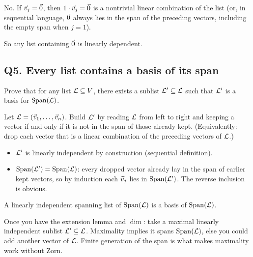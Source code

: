 \begin{coursebox}
No. If $\vec{v}_j=\vec{0}$, then $1\cdot\vec{v}_j=\vec{0}$ is a nontrivial linear combination
of the list (or, in sequential language, $\vec{0}$ always lies in the span of the
preceding vectors, including the empty span when $j=1$).

So any list containing $\vec{0}$ is linearly dependent.
\end{coursebox}

\subsection{Q5. Every list contains a basis of its span}

\begin{promptbox}
Prove that for any list $\mathcal{L}\subseteq V$, there exists a sublist $\mathcal{L}'\subseteq\mathcal{L}$
such that $\mathcal{L}'$ is a basis for $\operatorname{Span}(\mathcal{L})$.
\end{promptbox}

\begin{coursebox}
Let $\mathcal{L}=(\vec{v}_1,\ldots,\vec{v}_n)$. Build $\mathcal{L}'$ by reading $\mathcal{L}$ from left to right
and keeping a vector if and only if it is not in the span of those already kept.
(Equivalently: drop each vector that is a linear combination of the preceding
vectors of $\mathcal{L}$.)

\begin{itemize}
\item $\mathcal{L}'$ is linearly independent by construction (sequential definition).
\item $\operatorname{Span}(\mathcal{L}')=\operatorname{Span}(\mathcal{L})$: every dropped vector
already lay in the span of earlier kept vectors, so by induction each $\vec{v}_j$
lies in $\operatorname{Span}(\mathcal{L}')$. The reverse inclusion is obvious.
\end{itemize}
A linearly independent spanning list of $\operatorname{Span}(\mathcal{L})$ is a basis
of $\operatorname{Span}(\mathcal{L})$.
\end{coursebox}

\begin{laterbox}
Once you have the extension lemma and $\dim$: take a maximal linearly independent
sublist $\mathcal{L}'\subseteq\mathcal{L}$. Maximality implies it spans $\operatorname{Span}(\mathcal{L})$,
else you could add another vector of $\mathcal{L}$. Finite generation of the span is
what makes maximality work without Zorn.
\end{laterbox}
